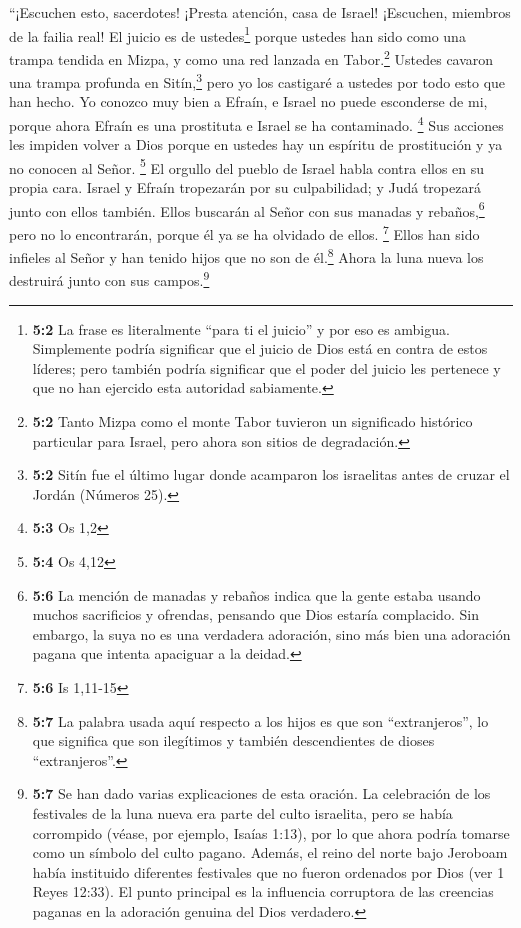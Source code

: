  ``¡Escuchen esto, sacerdotes! ¡Presta atención, casa de
Israel! ¡Escuchen, miembros de la failia real!  El juicio
es de ustedes\footnote{\textbf{5:2} La frase es literalmente ``para ti
  el juicio'' y por eso es ambigua. Simplemente podría significar que el
  juicio de Dios está en contra de estos líderes; pero también podría
  significar que el poder del juicio les pertenece y que no han ejercido
  esta autoridad sabiamente.} porque ustedes han sido como una trampa
tendida en Mizpa, y como una red lanzada en Tabor.\footnote{\textbf{5:2}
  Tanto Mizpa como el monte Tabor tuvieron un significado histórico
  particular para Israel, pero ahora son sitios de degradación.} Ustedes
cavaron una trampa profunda en Sitín,\footnote{\textbf{5:2} Sitín fue el
  último lugar donde acamparon los israelitas antes de cruzar el Jordán
  (Números 25).} pero yo los castigaré a ustedes por todo esto que han
hecho.  Yo conozco muy bien a Efraín, e Israel no puede
esconderse de mi, porque ahora Efraín es una prostituta e Israel se ha
contaminado. \footnote{\textbf{5:3} Os 1,2}  Sus acciones
les impiden volver a Dios porque en ustedes hay un espíritu de
prostitución y ya no conocen al Señor. \footnote{\textbf{5:4} Os 4,12}
 El orgullo del pueblo de Israel habla contra ellos en su
propia cara. Israel y Efraín tropezarán por su culpabilidad; y Judá
tropezará junto con ellos también.  Ellos buscarán al
Señor con sus manadas y rebaños,\footnote{\textbf{5:6} La mención de
  manadas y rebaños indica que la gente estaba usando muchos sacrificios
  y ofrendas, pensando que Dios estaría complacido. Sin embargo, la suya
  no es una verdadera adoración, sino más bien una adoración pagana que
  intenta apaciguar a la deidad.} pero no lo encontrarán, porque él ya
se ha olvidado de ellos. \footnote{\textbf{5:6} Is 1,11-15}
 Ellos han sido infieles al Señor y han tenido hijos que
no son de él.\footnote{\textbf{5:7} La palabra usada aquí respecto a los
  hijos es que son ``extranjeros'', lo que significa que son ilegítimos
  y también descendientes de dioses ``extranjeros''.} Ahora la luna
nueva los destruirá junto con sus campos.\footnote{\textbf{5:7} Se han
  dado varias explicaciones de esta oración. La celebración de los
  festivales de la luna nueva era parte del culto israelita, pero se
  había corrompido (véase, por ejemplo, Isaías 1:13), por lo que ahora
  podría tomarse como un símbolo del culto pagano. Además, el reino del
  norte bajo Jeroboam había instituido diferentes festivales que no
  fueron ordenados por Dios (ver 1 Reyes 12:33). El punto principal es
  la influencia corruptora de las creencias paganas en la adoración
  genuina del Dios verdadero.}

